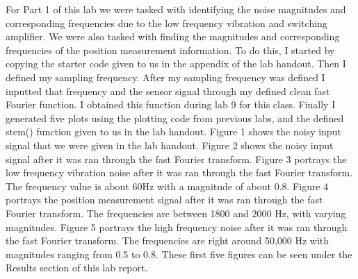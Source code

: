 \documentclass[12pt]{report}
\begin{document}
For Part 1 of this lab we were tasked with identifying the noise magnitudes and corresponding frequencies due to the low frequency vibration and switching amplifier. We were also tasked with finding the magnitudes and corresponding frequencies of the position measurement information. To do this, I started by copying the starter code given to us in the appendix of the lab handout. Then I defined my sampling frequency. After my sampling frequency was defined I inputted that frequency and the sensor signal through my defined clean fast Fourier function. I obtained this function during lab 9 for this class. Finally I generated five plots using the plotting code from previous labs, and the defined stem() function given to us in the lab handout. Figure 1 shows the noisy input signal that we were given in the lab handout. Figure 2 shows the noisy input signal after it was ran through the fast Fourier transform. Figure 3 portrays the low frequency vibration noise after it was ran through the fast Fourier transform. The frequency value is about 60Hz with a magnitude of about 0.8. Figure 4 portrays the position measurement signal after it was ran through the fast Fourier transform. The frequencies are between 1800 and 2000 Hz, with varying magnitudes. Figure 5 portrays the high frequency noise after it was ran through the fast Fourier transform. The frequencies are right around 50,000 Hz with magnitudes ranging from 0.5 to 0.8. These first five figures can be seen under the Results section of this lab report. 
\end{document}

